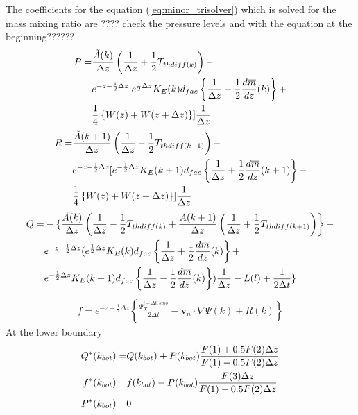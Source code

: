The coefficients for the equation (\ref{eq:minor_trisolver}) which
is solved for the mass mixing ratio are ???? check the pressure
levels and with the equation at the beginning??????
%
\begin{align}
  P = & \frac{\tilde{A}(k)}{\Delta z}\left( \frac{1}{\Delta z} + \frac{1}{2} T_{thdiff(k)}
  \right) - \notag \\
  {} & e^{-z -\frac{1}{2}\Delta z} [e^{\frac{1}{2}\Delta z} K_E(k)
  d_{fac} \left\{ \frac{1}{\Delta z} - \frac{1}{2}
  \frac{d\overline{m}}{dz}(k)\right\} + \notag \\
  {} & \frac{1}{4} \left\{ W(z)+W(z+\Delta z)\right\}
  ]\frac{1}{\Delta z}
\end{align}
%
\begin{align}
  R = & \frac{\tilde{A}(k+1)}{\Delta z}\left( \frac{1}{\Delta z} - \frac{1}{2} T_{thdiff(k+1)}
  \right) - \notag \\
  {} & e^{-z -\frac{1}{2}\Delta z} [e^{-\frac{1}{2}\Delta z} K_E(k+1)
  d_{fac} \left\{ \frac{1}{\Delta z} + \frac{1}{2}
  \frac{d\overline{m}}{dz}(k+1)\right\} - \notag \\
  {} &  \frac{1}{4} \left\{ W(z)+W(z+\Delta z)\right\}
  ]\frac{1}{\Delta z}
\end{align}
%
\begin{align}
  Q =& - \{ \frac{\tilde{A}(k)}{\Delta z}\left( \frac{1}{\Delta z} -
   \frac{1}{2} T_{thdiff(k)} + \frac{\tilde{A}(k+1)}{\Delta z}\left( \frac{1}{\Delta z}
   + \frac{1}{2} T_{thdiff(k+1)}
  \right) \right\}+ \notag \\
  {} & e^{-z -\frac{1}{2}\Delta z}( e^{\frac{1}{2}\Delta z} K_E(k)
  d_{fac} \left\{ \frac{1}{\Delta z} + \frac{1}{2}
  \frac{d\overline{m}}{dz}(k)\right\} + \notag \\
  {} & e^{-\frac{1}{2}\Delta z} K_E(k+1)
  d_{fac} \left\{ \frac{1}{\Delta z} - \frac{1}{2}
  \frac{d\overline{m}}{dz}(k)\right\})\frac{1}{\Delta z}-
  L(l)+\frac{1}{2 \Delta t} \}
\end{align}
%
\begin{align}
  f = e^{-z -\frac{1}{2}\Delta z}\left\{ \frac{\Psi_X^{t-\Delta t,smo}}{2 \Delta t} -
       \mathbf{v}_n\cdot \nabla \Psi(k) + R(k) \right\}
\end{align}
%
At the lower boundary
%
\begin{align}
  Q^*(k_{bot}) =&  Q(k_{bot}) + P(k_{bot})\frac{F(1) + 0.5 F(2)\Delta z}
        {F(1) - 0.5 F(2)\Delta z} \notag \\
  f^*(k_{bot}) =& f(k_{bot}) -P(k_{bot}) \frac{F(3)\Delta z}
        {F(1) - 0.5 F(2)\Delta z}  \notag \\
  P^*(k_{bot}) =& 0
\end{align}
